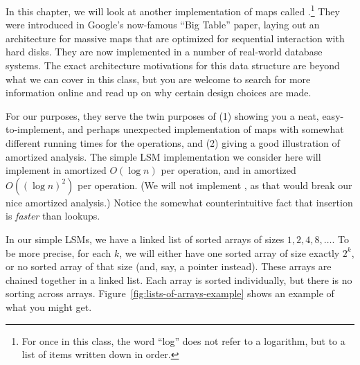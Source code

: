 In this chapter, we will look at another implementation of maps called
.\footnote{For once in this class,
  the word ``log'' does not refer to a logarithm, but to a list of
  items written down in order.}
They were introduced in Google's now-famous ``Big Table'' paper,
laying out an architecture for massive maps that are optimized for
sequential interaction with hard disks. They are now implemented in a
number of real-world database systems. The exact architecture
motivations for this data structure are beyond what we can cover in
this class, but you are welcome to search for more information online
and read up on why certain design choices are made.

For our purposes, they serve the twin purposes of (1) showing you a
neat, easy-to-implement, and perhaps unexpected implementation of maps
with somewhat different running times for the operations, and (2)
giving a good illustration of amortized analysis.
The simple LSM implementation we consider here will implement 
in amortized $O(\log n)$ per operation, and  in amortized
$O((\log n)^2)$ per operation. (We will not implement , as
that would break our nice amortized analysis.)
Notice the somewhat counterintuitive fact that insertion is
\emph{faster} than lookups.

In our simple LSMs, we have a linked list of sorted arrays of sizes
$1, 2, 4, 8, \ldots$.
To be more precise, for each $k$, we will either have one sorted array
of size exactly $2^k$, or no sorted array of that size (and, say, a
 pointer instead). 
These arrays are chained together in a linked list. 
Each array is sorted individually, but there is no sorting across
arrays. Figure~\ref{fig:lists-of-arrays-example} shows an example of
what you might get.

